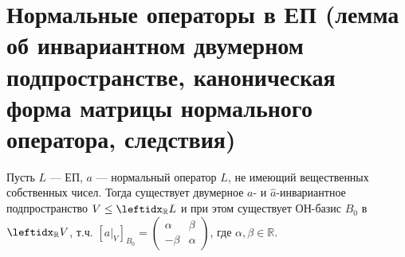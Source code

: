 \section{Нормальные операторы в ЕП (лемма об инвариантном двумерном подпространстве, каноническая форма матрицы нормального оператора, следствия)}


\begin{lem*}
    Пусть $L$ --- ЕП, $a$ --- нормальный оператор $L$, не имеющий вещественных собственных чисел. Тогда существует двумерное $a$- и $\hat{a}$-инвариантное подпространство $V \le \lsub{\mathbb{R}}{L}$ и при этом существует ОН-базис $B_0$ в $\lsub{\mathbb{R}}{V}$, т.ч. $[a\vert_V]_{B_0} = \begin{pmatrix}
        \alpha & \beta \\
        -\beta & \alpha
    \end{pmatrix}$, где $\alpha, \beta \in \mathbb{R}$.
\end{lem*}

